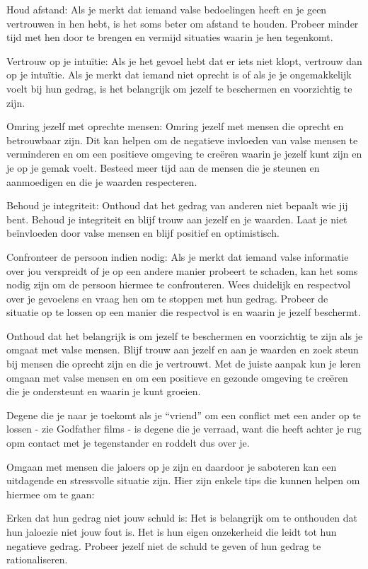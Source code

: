 Houd afstand: Als je merkt dat iemand valse bedoelingen heeft en je geen vertrouwen in hen hebt, is het soms beter om afstand te houden. Probeer minder tijd met hen door te brengen en vermijd situaties waarin je hen tegenkomt.

Vertrouw op je intuïtie: Als je het gevoel hebt dat er iets niet klopt, vertrouw dan op je intuïtie. Als je merkt dat iemand niet oprecht is of als je je ongemakkelijk voelt bij hun gedrag, is het belangrijk om jezelf te beschermen en voorzichtig te zijn.

Omring jezelf met oprechte mensen: Omring jezelf met mensen die oprecht en betrouwbaar zijn. Dit kan helpen om de negatieve invloeden van valse mensen te verminderen en om een positieve omgeving te creëren waarin je jezelf kunt zijn en je op je gemak voelt. Besteed meer tijd aan de mensen die je steunen en aanmoedigen en die je waarden respecteren.

Behoud je integriteit: Onthoud dat het gedrag van anderen niet bepaalt wie jij bent. Behoud je integriteit en blijf trouw aan jezelf en je waarden. Laat je niet beïnvloeden door valse mensen en blijf positief en optimistisch.

Confronteer de persoon indien nodig: Als je merkt dat iemand valse informatie over jou verspreidt of je op een andere manier probeert te schaden, kan het soms nodig zijn om de persoon hiermee te confronteren. Wees duidelijk en respectvol over je gevoelens en vraag hen om te stoppen met hun gedrag. Probeer de situatie op te lossen op een manier die respectvol is en waarin je jezelf beschermt.

Onthoud dat het belangrijk is om jezelf te beschermen en voorzichtig te zijn als je omgaat met valse mensen. Blijf trouw aan jezelf en aan je waarden en zoek steun bij mensen die oprecht zijn en die je vertrouwt. Met de juiste aanpak kun je leren omgaan met valse mensen en om een positieve en gezonde omgeving te creëren die je ondersteunt en waarin je kunt groeien.

Degene die je naar je toekomt als je “vriend” om een conflict met een ander op te lossen - zie Godfather films - is degene die je verraad, want die heeft achter je rug opm contact met je tegenstander en roddelt dus over je.

Omgaan met mensen die jaloers op je zijn en daardoor je saboteren kan een uitdagende en stressvolle situatie zijn. Hier zijn enkele tips die kunnen helpen om hiermee om te gaan:

Erken dat hun gedrag niet jouw schuld is: Het is belangrijk om te onthouden dat hun jaloezie niet jouw fout is. Het is hun eigen onzekerheid die leidt tot hun negatieve gedrag. Probeer jezelf niet de schuld te geven of hun gedrag te rationaliseren.


